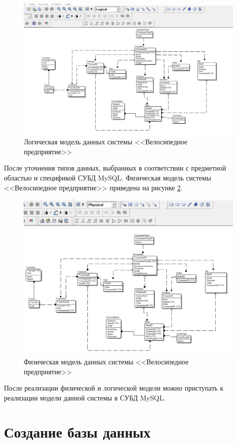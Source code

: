 \documentclass[a4paper,14pt]{extarticle}
\begin{document}
\begin{figure}[h!]
	\centering
	\includegraphics[width=0.8\linewidth]{images/2-cycle-logical}
	\caption{Логическая модель данных системы <<Велосипедное предприятие>>}
	\label{fig:2-cycle-logical}
\end{figure}

После уточнения типов данных, выбранных в соответствии с предметной областью и спецификой СУБД MySQL.
Физическая модель системы <<Велосипедное предприятие>> приведена на рисунке \ref{fig:2-cycle-phisical}.

\begin{figure}[h!]
	\centering
	\includegraphics[width=0.8\linewidth]{images/2-cycle-phisical}
	\caption{Физическая модель данных системы <<Велосипедное предприятие>>}
	\label{fig:2-cycle-phisical}
\end{figure}

После реализации физической и логической модели можно приступать к реализации модели данной системы в СУБД MySQL.
\hfill
\newpage
\section{Создание базы данных}
\end{document}
